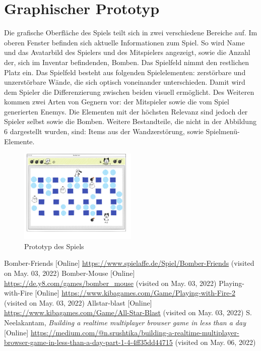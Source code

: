 \documentclass[conference]{IEEEtran}
\begin{document}
\section{Graphischer Prototyp}
Die grafische Oberfläche des Spiels teilt sich in zwei verschiedene Bereiche auf. Im oberen Fenster befinden sich aktuelle Informationen zum Spiel. So wird Name und das Avatarbild des Spielers und des Mitspielers angezeigt, sowie die Anzahl der, sich im Inventar befindenden, Bomben. Das Spielfeld nimmt den restlichen Platz ein. Das Spielfeld besteht aus folgenden Spielelementen: zerstörbare und unzerstörbare Wände, die sich optisch voneinander unterschieden. Damit wird dem Spieler die Differenzierung zwischen beiden visuell ermöglicht. Des Weiteren kommen zwei Arten von Gegnern vor: der Mitspieler sowie die vom Spiel generierten Enemys. Die Elementen mit der höchsten Relevanz sind jedoch der Spieler selbst sowie die Bomben. Weitere Bestandteile, die nicht in der Abbildung 6 dargestellt wurden, sind: Items aus der Wandzerstörung, sowie Spielmenü-Elemente. 
\begin{figure}[H]
    \centering
    \includegraphics[width=0.5\textwidth]{res/prototyp.png}
    \caption{Prototyp des Spiels}
\end{figure}

\nocite{space-invaders}
\begin{thebibliography}{0}
	Bomber-Friends [Online] \url{https://www.spielaffe.de/Spiel/Bomber-Friends} (visited on May. 03, 2022)
	Bomber-Mouse [Online] \url{https://de.y8.com/games/bomber_mouse} (visited on May. 03, 2022)
	Playing-with-Fire [Online] \url{https://www.kibagames.com/Game/Playing-with-Fire-2 } (visited on May. 03, 2022)
	Allstar-blast [Online] \url{https://www.kibagames.com/Game/All-Star-Blast} (visited on May. 03, 2022)
	S. Neelakantam,	\textit{Building a realtime multiplayer browser game in less than a day} [Online] \url{https://medium.com/@n.srushtika/building-a-realtime-multiplayer-browser-game-in-less-than-a-day-part-1-4-4ff35dd44715} (visited on May. 06, 2022)

\end{thebibliography}
\vspace{12pt}
\end{document}
